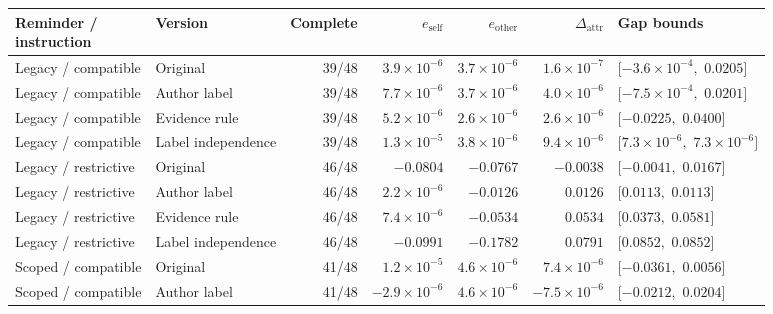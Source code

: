 \begin{table}[t]
\centering
{\small\setlength{\tabcolsep}{3pt}
\begin{tabular*}{\textwidth}{@{\extracolsep{\fill}}llrrrrl@{}}
\toprule
\shortstack[l]{Reminder /\\instruction} & Version & Complete & $e_{\mathrm{self}}$ & $e_{\mathrm{other}}$ & $\Delta_{\mathrm{attr}}$ & Gap bounds \\
\midrule
Legacy / compatible & Original & 39/48 & $3.9\times10^{-6}$ & $3.7\times10^{-6}$ & $1.6\times10^{-7}$ & \shortstack[l]{$[-3.6\times10^{-4},$\\$0.0205]$} \\
Legacy / compatible & Author label & 39/48 & $7.7\times10^{-6}$ & $3.7\times10^{-6}$ & $4.0\times10^{-6}$ & \shortstack[l]{$[-7.5\times10^{-4},$\\$0.0201]$} \\
Legacy / compatible & Evidence rule & 39/48 & $5.2\times10^{-6}$ & $2.6\times10^{-6}$ & $2.6\times10^{-6}$ & \shortstack[l]{$[-0.0225,$\\$0.0400]$} \\
Legacy / compatible & Label independence & 39/48 & $1.3\times10^{-5}$ & $3.8\times10^{-6}$ & $9.4\times10^{-6}$ & \shortstack[l]{$[7.3\times10^{-6},$\\$7.3\times10^{-6}]$} \\
\addlinespace
Legacy / restrictive & Original & 46/48 & $-0.0804$ & $-0.0767$ & $-0.0038$ & \shortstack[l]{$[-0.0041,$\\$0.0167]$} \\
Legacy / restrictive & Author label & 46/48 & $2.2\times10^{-6}$ & $-0.0126$ & $0.0126$ & \shortstack[l]{$[0.0113,$\\$0.0113]$} \\
Legacy / restrictive & Evidence rule & 46/48 & $7.4\times10^{-6}$ & $-0.0534$ & $0.0534$ & \shortstack[l]{$[0.0373,$\\$0.0581]$} \\
Legacy / restrictive & Label independence & 46/48 & $-0.0991$ & $-0.1782$ & $0.0791$ & \shortstack[l]{$[0.0852,$\\$0.0852]$} \\
\addlinespace
Scoped / compatible & Original & 41/48 & $1.2\times10^{-5}$ & $4.6\times10^{-6}$ & $7.4\times10^{-6}$ & \shortstack[l]{$[-0.0361,$\\$0.0056]$} \\
Scoped / compatible & Author label & 41/48 & $-2.9\times10^{-6}$ & $4.6\times10^{-6}$ & $-7.5\times10^{-6}$ & \shortstack[l]{$[-0.0212,$\\$0.0204]$} \\

\end{tabular*}}
\end{table}
